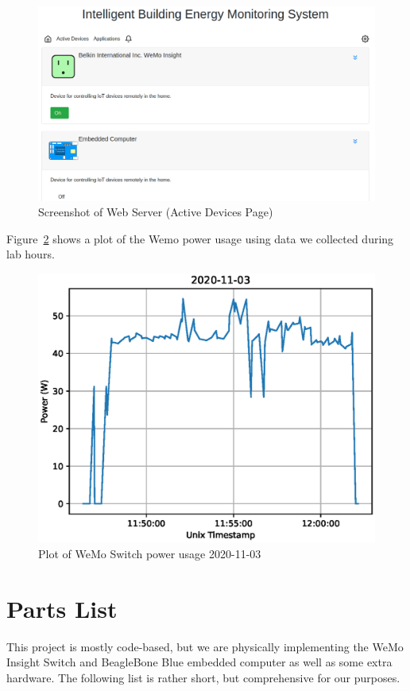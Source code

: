 \documentclass[letterpaper,12pt]{article}   %
\begin{document}
\begin{figure}
    \centering
    \includegraphics[scale=0.4]{figs/activeDevicesWithEmbeddedPicture.png}
    \caption{Screenshot of Web Server (Active Devices Page)}
    \label{fig:activeDevicesPageScreenCap}
\end{figure}

Figure~\ref{fig:powerPlotWeMoSwitch} shows a plot of the Wemo power usage using data we collected during lab hours.

\begin{figure}[H]
    \centering
    \includegraphics[scale=0.5]{figs/powerPlot2020-11-03.eps}
    \caption{Plot of WeMo Switch power usage 2020-11-03}
    \label{fig:powerPlotWeMoSwitch}
\end{figure}

\section{Parts List}
This project is mostly code-based, but we are physically implementing the WeMo Insight Switch and BeagleBone Blue embedded computer as well as some extra hardware. The following list is rather short, but comprehensive for our purposes.
\end{document}
